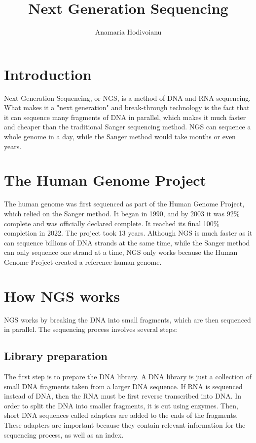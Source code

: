 \documentclass{article}
\title{Next Generation Sequencing}
\author{Anamaria Hodivoianu}
\begin{document}
\maketitle

\section{Introduction}
Next Generation Sequencing, or NGS, is a method of DNA and RNA sequencing. What makes it a "next generation" and break-through technology is the fact that it can sequence many fragments of DNA in parallel, which makes it much faster and cheaper than the traditional Sanger sequencing method. NGS can sequence a whole genome in a day, while the Sanger method would take months or even years.

\section{The Human Genome Project}
The human genome was first sequenced as part of the Human Genome Project, which relied on the Sanger method. It began in 1990, and by 2003 it was 92\% complete and was officially declared complete. It reached its final 100\% completion in 2022. The project took 13 years. Although NGS is much faster as it can sequence billions of DNA strands at the same time, while the Sanger method can only sequence one strand at a time, NGS only works because the Human Genome Project created a reference human genome.

\section{How NGS works}
NGS works by breaking the DNA into small fragments, which are then sequenced in parallel. The sequencing process involves several steps:

\subsection{Library preparation}
The first step is to prepare the DNA library. A DNA library is just a collection of small DNA fragments taken from a larger DNA sequence. If RNA is sequenced instead of DNA, then the RNA must be first reverse transcribed into DNA. In order to split the DNA into smaller fragments, it is cut using enzymes. Then, short DNA sequences called adapters are added to the ends of the fragments. These adapters are important because they contain relevant information for the sequencing process, as well as an index.
\end{document}
